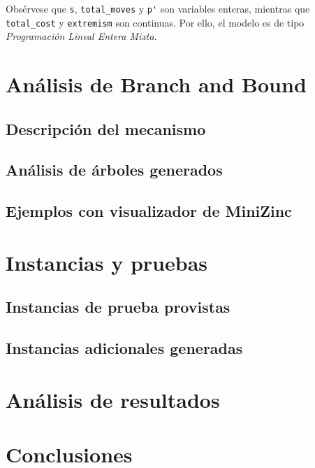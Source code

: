 Obsérvese que \texttt{s}, \texttt{total\_moves} y \texttt{p\'} son variables enteras, mientras que \texttt{total\_cost} y \texttt{extremism} son continuas. Por ello, el modelo es de tipo \emph{Programación Lineal Entera Mixta}.

\section{Análisis de Branch and Bound}

\subsection{Descripción del mecanismo}

\subsection{Análisis de árboles generados}

\subsection{Ejemplos con visualizador de MiniZinc}

\section{Instancias y pruebas}

\subsection{Instancias de prueba provistas}

\subsection{Instancias adicionales generadas}

\section{Análisis de resultados}

\section{Conclusiones}


